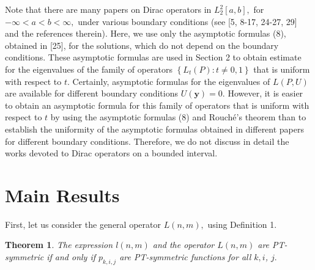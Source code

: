 \documentclass{article}%
\newtheorem{theorem}{Theorem}
{}
\begin{document}
Note that there are many papers on Dirac operators in $L_{2}^{2}[a,b],$ for
$-\infty<a<b<\infty,$ under various boundary conditions (see [5, 8-17, 24-27,
29] and the references therein). Here, we use only the asymptotic formulas
(8), obtained in [25], for the solutions, which do not depend on the boundary
conditions. These asymptotic formulas are used in Section 2 to obtain estimate
for the eigenvalues of the family of operators $\left\{  L_{t}(P):t\neq
0,1\right\}  $ that is uniform with respect to $t$. Certainly, asymptotic
formulas for the eigenvalues of $L(P,U)$ are available for different boundary
conditions $U(\mathbf{y})=0$. However, it is easier to obtain an asymptotic
formula for this family of operators that is uniform with respect to $t$ by
using the asymptotic formulas (8) and Rouch\'{e}'s theorem than to establish
the uniformity of the asymptotic formulas obtained in different papers for
different boundary conditions. Therefore, we do not discuss in detail the
works devoted to Dirac operators on a bounded interval.

\section{Main Results}

First, let us consider the general operator $L(n,m),$ using Definition 1.

\begin{theorem}
The expression $l(n,m)$ and the operator $L(n,m)$ are PT-symmetric if and only
if $p_{k,i,j}$ are PT-symmetric functions for all $k,i$, $j.$
\end{theorem}
\end{document}
